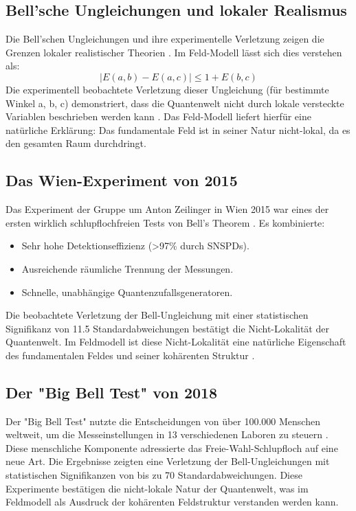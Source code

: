 \documentclass[12pt,a4paper]{article}
\begin{document}
	\subsection{Bell'sche Ungleichungen und lokaler Realismus}
	Die Bell'schen Ungleichungen und ihre experimentelle Verletzung zeigen die Grenzen lokaler realistischer Theorien \cite{Bell1964}. Im Feld-Modell lässt sich dies verstehen als:
	\begin{equation}
		|E(a,b) - E(a,c)| \leq 1 + E(b,c)
	\end{equation}
	Die experimentell beobachtete Verletzung dieser Ungleichung (für bestimmte Winkel a, b, c) demonstriert, dass die Quantenwelt nicht durch lokale versteckte Variablen beschrieben werden kann \cite{Aspect1982}. Das Feld-Modell liefert hierfür eine natürliche Erklärung: Das fundamentale Feld ist in seiner Natur nicht-lokal, da es den gesamten Raum durchdringt.
	
	\subsection{Das Wien-Experiment von 2015}
	Das Experiment der Gruppe um Anton Zeilinger in Wien 2015 war eines der ersten wirklich schlupflochfreien Tests von Bell's Theorem \cite{Giustina2015}. Es kombinierte:
	\begin{itemize}
		\item Sehr hohe Detektionseffizienz (>97\% durch SNSPDs).
		\item Ausreichende räumliche Trennung der Messungen.
		\item Schnelle, unabhängige Quantenzufallsgeneratoren.
	\end{itemize}
	Die beobachtete Verletzung der Bell-Ungleichung mit einer statistischen Signifikanz von 11.5 Standardabweichungen bestätigt die Nicht-Lokalität der Quantenwelt. Im Feldmodell ist diese Nicht-Lokalität eine natürliche Eigenschaft des fundamentalen Feldes und seiner kohärenten Struktur \cite{Zeilinger2010}.
	
	\subsection{Der "Big Bell Test" von 2018}
	Der "Big Bell Test" nutzte die Entscheidungen von über 100.000 Menschen weltweit, um die Messeinstellungen in 13 verschiedenen Laboren zu steuern \cite{BigBellTest2018}. Diese menschliche Komponente adressierte das Freie-Wahl-Schlupfloch auf eine neue Art. Die Ergebnisse zeigten eine Verletzung der Bell-Ungleichungen mit statistischen Signifikanzen von bis zu 70 Standardabweichungen.
	Diese Experimente bestätigen die nicht-lokale Natur der Quantenwelt, was im Feldmodell als Ausdruck der kohärenten Feldstruktur verstanden werden kann.
	
\end{document}
